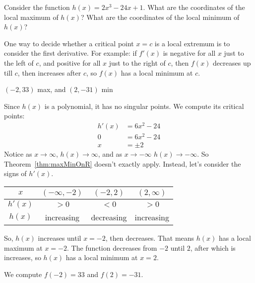 \begin{question}[2015Q]\label{s3.5.3firstderivlast}
Consider the function $h(x)=2x^3-24x+1$.
What are the coordinates of the local maximum of $h(x)$? What are the coordinates of the local minimum of $h(x)$?
\end{question}
\begin{hint}
One way to decide whether a critical point $x=c$ is a local extremum is to consider the first derivative. For example: if $f'(x)$ is negative for all $x$ just to the left of $c$, and positive for all $x$ just to the right of $c$, then $f(x)$ decreases up till $c$, then increases after $c$, so $f(x)$ has a local minimum at $c$.
\end{hint}
\begin{answer}
$(-2,33)$ max, and $(2,-31)$ min
\end{answer}
\begin{solution}
Since $h(x)$ is a polynomial, it has no singular points. We compute its critical points:
\begin{align*}
h'(x)&=6x^2-24\\
0&=6x^2-24\\
x&=\pm2
\end{align*}
Notice as $x\to\infty$, $h(x)\to\infty$, and as $x\to-\infty$ $h(x)\to-\infty$. So Theorem~\ref*{thm:maxMinOnR} doesn't exactly apply. Instead, let's consider the signs of $h'(x)$.

\begin{center}
\begin{tabular}{|c||c|c|c|}
\hline
$x$ & $(-\infty,-2)$ &  $(-2,2)$ &  $(2,\infty)$  \\
\hline
$h'(x)$ & $>0$ & $<0$ & $>0$ \\
\hline
$h(x)$ & increasing & decreasing & increasing  \\
\hline
\end{tabular}
\end{center}
So, $h(x)$ increases until $x=-2$, then decreases. That means $h(x)$ has a local maximum at $x=-2$. The function decreases from $-2$ until $2$, after which is increases, so $h(x)$ has a local minimum at $x=2$.

 We compute $f(-2)=33$ and $f(2)=-31$.
\end{solution}







